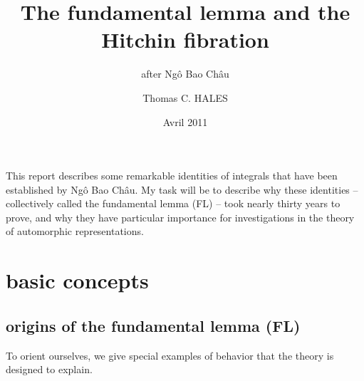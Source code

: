 \documentclass[brochure,english,12pt]{bourbaki}
\date{Avril 2011}
\title{The fundamental lemma and the Hitchin fibration}
\subtitle{after Ng\^o Bao Ch\^au}
\author{Thomas C. HALES}
\theoremstyle{plain}
\begin{document}
\maketitle



{


}

\bigskip



This report describes some remarkable identities of integrals that have
been established by Ng\^o Bao Ch\^au.   My task will be to describe
why these identities -- collectively called the fundamental lemma (FL) --
took nearly thirty years to prove, and why they have particular
importance for investigations in the theory of automorphic
representations.



\section{basic concepts}

\subsection{origins of the fundamental lemma (FL)}\label{sec:origin}


To orient ourselves, we give special examples of
behavior that the theory is designed to explain.
\end{document}
